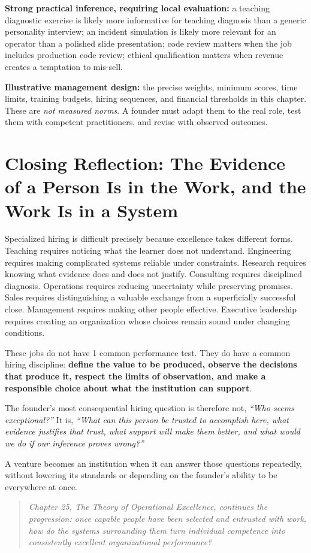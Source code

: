 \textbf{Strong practical inference, requiring local evaluation:} a teaching diagnostic exercise is likely more informative for teaching diagnosis than a generic personality interview; an incident simulation is likely more relevant for an operator than a polished slide presentation; code review matters when the job includes production code review; ethical qualification matters when revenue creates a temptation to mis-sell.

\textbf{Illustrative management design:} the precise weights, minimum scores, time limits, training budgets, hiring sequences, and financial thresholds in this chapter. These are \textit{not measured norms}. A founder must adapt them to the real role, test them with competent practitioners, and revise with observed outcomes.

\section*{Closing Reflection: The Evidence of a Person Is in the Work, and the Work Is in a System}

Specialized hiring is difficult precisely because excellence takes different forms. Teaching requires noticing what the learner does not understand. Engineering requires making complicated systems reliable under constraints. Research requires knowing what evidence does and does not justify. Consulting requires disciplined diagnosis. Operations requires reducing uncertainty while preserving promises. Sales requires distinguishing a valuable exchange from a superficially successful close. Management requires making other people effective. Executive leadership requires creating an organization whose choices remain sound under changing conditions.

These jobs do not have 1 common performance test. They do have a common hiring discipline: \textbf{define the value to be produced, observe the decisions that produce it, respect the limits of observation, and make a responsible choice about what the institution can support}.

The founder's most consequential hiring question is therefore not, \textit{``Who seems exceptional?''} It is, \textit{``What can this person be trusted to accomplish here, what evidence justifies that trust, what support will make them better, and what would we do if our inference proves wrong?''}

A venture becomes an institution when it can answer those questions repeatedly, without lowering its standards or depending on the founder's ability to be everywhere at once.

\begin{quote}
\textit{Chapter 25, The Theory of Operational Excellence, continues the progression: once capable people have been selected and entrusted with work, how do the systems surrounding them turn individual competence into consistently excellent organizational performance?}
\end{quote}
